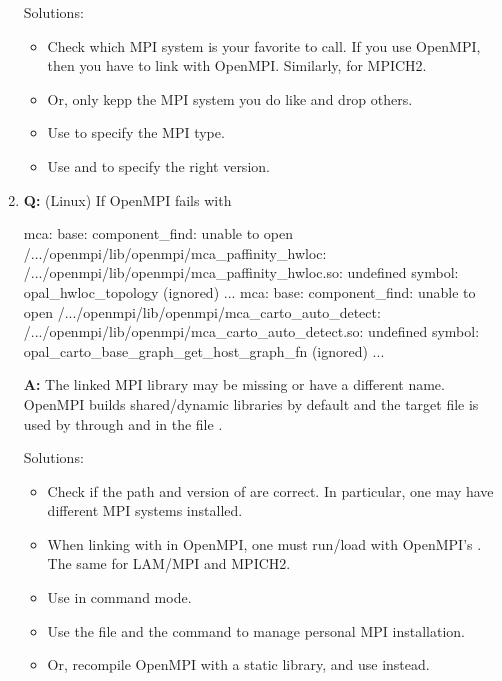 \begin{enumerate}
      Solutions:
      \begin{itemize}
      \item Check which MPI system is your favorite to call. If you use
            OpenMPI, then you have to link with OpenMPI. Similarly, for
            MPICH2.
      \item Or, only kepp the MPI system you do like and drop others.
      \item Use \code{-} to specify the MPI type.
      \item Use \code{-} and
            \code{-} to
            specify the right version.
      \end{itemize}

\item {\bf\color{blue} Q:}
      (Linux) If OpenMPI  fails with
\begin{Error}
mca: base: component_find: unable to open
/.../openmpi/lib/openmpi/mca_paffinity_hwloc:
/.../openmpi/lib/openmpi/mca_paffinity_hwloc.so:
undefined symbol: opal_hwloc_topology (ignored)
...
mca: base: component_find: unable to open
/.../openmpi/lib/openmpi/mca_carto_auto_detect:
/.../openmpi/lib/openmpi/mca_carto_auto_detect.so:
undefined symbol: opal_carto_base_graph_get_host_graph_fn (ignored)
...
\end{Error}
      {\bf\color{blue} A:}
      The linked MPI library  may be missing or have a
      different name.
      OpenMPI builds shared/dynamic libraries by default and the target
      file  is used by 
      through  and  in the file
      .

      Solutions:
      \begin{itemize}
      \item Check if the path and version of  are correct.
            In particular, one may have different MPI systems installed.
      \item When linking with  in OpenMPI, one must run/load
             with OpenMPI's . The same for
            LAM/MPI and MPICH2.
      \item Use  in command mode.
      \item Use the file  and the command 
            to manage personal MPI installation.
      \item Or, recompile OpenMPI with a static library, and use
             instead.
      \end{itemize}



\end{enumerate}
